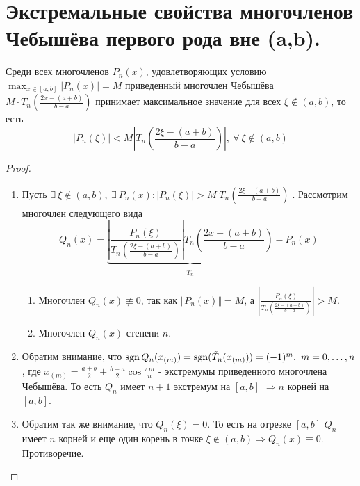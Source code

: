 \section{Экстремальные свойства многочленов Чебышёва
  первого рода вне (a,b).}

\begin{theorem}
  Среди всех многочленов $P_n(x)$, удовлетворяющих условию $\max_{x\in[a,b]}|P_n(x)|=M$
  приведенный многочлен Чебышёва $M\cdot T_n\left(\frac{2x-(a+b)}{b-a}\right)$ принимает максимальное значение
  для всех $\xi\notin(a,b)$, то есть
  \[|P_n(\xi)|<M\left|T_n\left(\frac{2\xi-(a+b)}{b-a}\right)\right|,\ \forall\ \xi\notin(a,b)\]
\end{theorem}
\begin{proof}
  \begin{enumerate}
    \item Пусть $\exists\ \xi\notin(a,b),\ \exists\ P_n(x): |P_n(\xi)|>M\left|T_n\left(\frac{2\xi-(a+b)}{b-a}\right)\right|$. Рассмотрим многочлен следующего вида
          \[Q_n(x)=\underbrace{\left|\frac{P_n(\xi)}{T_n\left(\frac{2\xi-(a+b)}{b-a}\right)}\right|T_n\left(\frac{2x-(a+b)}{b-a}\right)}_{\tilde{T}_n} - P_n(x)\]
          \begin{enumerate}
            \item Многочлен $Q_n(x)\not\equiv0$, так как $\Vert P_n(x)\Vert=M$, а $\left|\frac{P_n(\xi)}{T_n\left(\frac{2\xi-(a+b)}{b-a}\right)}\right|>M$.
            \item Многочлен $Q_n(x)$ степени $n$.
          \end{enumerate}
    \item Обратим внимание, что $\operatorname{sgn} Q_n(x_{(m)})=\operatorname{sgn}(\tilde{T}_n(x_{(m)}))=(-1)^m,\ m=0,\ldots,n$, где $x_{(m)}=\frac{a+b}{2}+\frac{b-a}{2}\cos\frac{\pi m}{n}$
          - экстремумы приведенного многочлена Чебышёва. То есть $Q_n$ имеет $n+1$ экстремум на $[a,b]$ $\Rightarrow n$ корней на $[a,b]$.
    \item Обратим так же внимание, что $Q_n(\xi)=0$. То есть на отрезке $[a,b]$
          $Q_n$ имеет $n$ корней и еще один корень в точке $\xi\notin(a,b)\Rightarrow Q_n(x)\equiv0$. Противоречие.
  \end{enumerate}
\end{proof}

